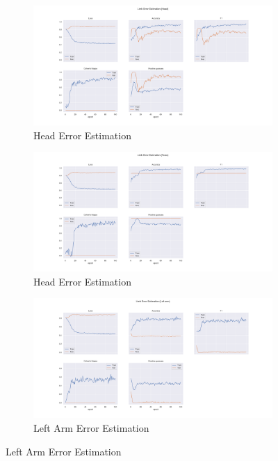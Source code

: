 \begin{figure}
  \centering
  \begin{subfigure}[b]{0.9\linewidth}
      \centering
      \includegraphics[width=\textwidth]{figures/Results/lb/LimbErrorEstimation_Head.png}
      \caption{Head Error Estimation}
      \label{fig:head_lb_ee}
  \end{subfigure}
  \hfill
  \begin{subfigure}[b]{0.9\linewidth}
      \centering
      \includegraphics[width=\textwidth]{figures/Results/lb/LimbErrorEstimation_Torso.png}
      \caption{Head Error Estimation}
      \label{fig:torso_lb_ee}
  \end{subfigure}
  \hfill
  \begin{subfigure}[b]{0.9\linewidth}
      \centering
      \includegraphics[width=\textwidth]{figures/Results/lb/LimbErrorEstimation_Left arm.png}
      \caption{Left Arm Error Estimation}
      \label{fig:lear_lb_ee}
  \end{subfigure}
\end{figure}

